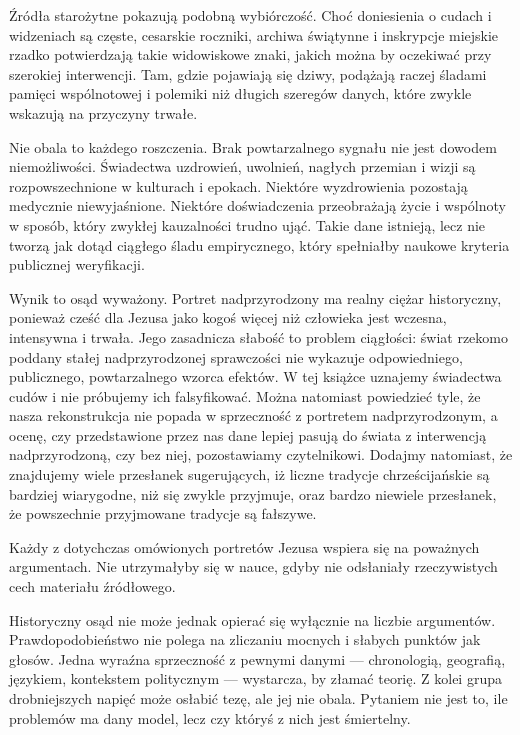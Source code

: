 Źródła starożytne pokazują podobną wybiórczość.
Choć doniesienia o cudach i widzeniach są częste, cesarskie roczniki, archiwa świątynne i inskrypcje miejskie rzadko potwierdzają takie widowiskowe znaki, jakich można by oczekiwać przy szerokiej interwencji.
Tam, gdzie pojawiają się dziwy, podążają raczej śladami pamięci wspólnotowej i polemiki niż długich szeregów danych, które zwykle wskazują na przyczyny trwałe.

Nie obala to każdego roszczenia.
Brak powtarzalnego sygnału nie jest dowodem niemożliwości.
Świadectwa uzdrowień, uwolnień, nagłych przemian i wizji są rozpowszechnione w kulturach i epokach.
Niektóre wyzdrowienia pozostają medycznie niewyjaśnione.
Niektóre doświadczenia przeobrażają życie i wspólnoty w sposób, który zwykłej kauzalności trudno ująć.
Takie dane istnieją, lecz nie tworzą jak dotąd ciągłego śladu empirycznego, który spełniałby naukowe kryteria publicznej weryfikacji.

Wynik to osąd wyważony.
Portret nadprzyrodzony ma realny ciężar historyczny, ponieważ cześć dla Jezusa jako kogoś więcej niż człowieka jest wczesna, intensywna i trwała.
Jego zasadnicza słabość to problem ciągłości: świat rzekomo poddany stałej nadprzyrodzonej sprawczości nie wykazuje odpowiedniego, publicznego, powtarzalnego wzorca efektów.
W tej książce uznajemy świadectwa cudów i nie próbujemy ich falsyfikować.
Można natomiast powiedzieć tyle, że nasza rekonstrukcja nie popada w sprzeczność z portretem nadprzyrodzonym, a ocenę, czy przedstawione przez nas dane lepiej pasują do świata z interwencją nadprzyrodzoną, czy bez niej, pozostawiamy czytelnikowi.
Dodajmy natomiast, że znajdujemy wiele przesłanek sugerujących, iż liczne tradycje chrześcijańskie są bardziej wiarygodne, niż się zwykle przyjmuje, oraz bardzo niewiele przesłanek, że powszechnie przyjmowane tradycje są fałszywe.

\medskip

Każdy z dotychczas omówionych portretów Jezusa wspiera się na poważnych argumentach.
Nie utrzymałyby się w nauce, gdyby nie odsłaniały rzeczywistych cech materiału źródłowego.

Historyczny osąd nie może jednak opierać się wyłącznie na liczbie argumentów.
Prawdopodobieństwo nie polega na zliczaniu mocnych i słabych punktów jak głosów.
Jedna wyraźna sprzeczność z pewnymi danymi — chronologią, geografią, językiem, kontekstem politycznym — wystarcza, by złamać teorię.
Z kolei grupa drobniejszych napięć może osłabić tezę, ale jej nie obala.
Pytaniem nie jest to, ile problemów ma dany model, lecz czy któryś z nich jest śmiertelny.

